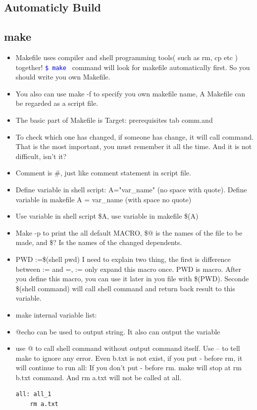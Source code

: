 \documentclass[a4paper,12pt,twoside]{book}
\newcommand{\linuxcommand}[1]{\texttt{\textcolor{blue}{\$ #1 \Pisymbol{psy}{191}}}}
\begin{document}
\begin{itemize}
\begin{itemize}
\section{Automaticly Build}
\subsection{make}

	\begin{itemize}
		\item Makefile uses compiler and shell programming tools( such as rm, cp etc ) together! \linuxcommand{make} command will look for makefile automatically first. So you should write you own Makefile.
		\item You also can use make -f to specify you own makefile name, A Makefile can be regarded as a script file.

		\item The basic part of Makefile is Target: prerequisites
                        tab comm.and
		\item To check which one has changed, if someone has change, it will call command. That is the most important, you must remember it all the time.  And it is not difficult, isn't it?

		\item Comment is \#, just like comment statement in script file.
		
		\item Define variable in shell script: A="var\_name" (no space with quote). Define variable in makefile A = var\_name (with space no quote)
		\item Use variable in shell script \$A, use variable in makefile \$(A)
		
		
		\item Make -p to print the all default MACRO, \$@ is the names of the file to be made, and \$? Is the names of
the changed dependents.

		\item PWD :=\$(shell pwd) I need to explain two thing, the first is difference between := and =, := only
expand this macro once.    PWD is macro. After you define this macro, you can use it later in you file with
\$(PWD). Seconde \$(shell command) will call shell command and return back result to this variable. 

\item make internal variable list:


		\item @echo can be used to output string. It also can output the variable
		\item use @ to call shell command without output command itself. Use – to tell make to ignore any error. Even b.txt is not exist, if you put - before rm, it will continue to run all: If you don't put - before rm. make will stop at rm b.txt command. And rm a.txt will not be called at all.  
\begin{verbatim}
all: all_1
	rm a.txt
	 

\end{verbatim}
\end{itemize}
\end{itemize}
\end{itemize}
\end{document}
